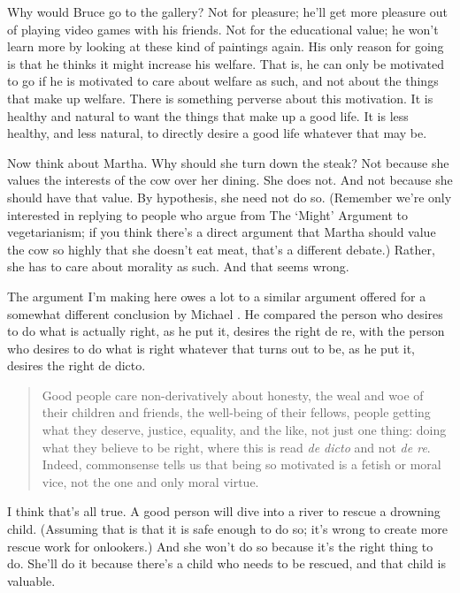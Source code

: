 Why would Bruce go to the gallery? Not for pleasure; he'll get more pleasure out of playing video games with his friends. Not for the educational value; he won't learn more by looking at these kind of paintings again. His only reason for going is that he thinks it might increase his welfare. That is, he can only be motivated to go if he is motivated to care about welfare as such, and not about the things that make up welfare. There is something perverse about this motivation. It is healthy and natural to want the things that make up a good life. It is less healthy, and less natural, to directly desire a good life whatever that may be. 

Now think about Martha. Why should she turn down the steak? Not because she values the interests of the cow over her dining. She does not. And not because she should have that value. By hypothesis, she need not do so. (Remember we're only interested in replying to people who argue from The `Might' Argument to vegetarianism; if you think there's a direct argument that Martha should value the cow so highly that she doesn't eat meat, that's a different debate.) Rather, she has to care about morality as such. And that seems wrong.

The argument I'm making here owes a lot to a similar argument offered for a somewhat different conclusion by Michael  \citet{Smith1994}. He compared the person who desires to do what is actually right, as he put it, desires the right de re, with the person who desires to do what is right whatever that turns out to be, as he put it, desires the right de dicto. 

\begin{quote}

Good people care non-derivatively about honesty, the weal and woe of their children and friends, the well-being of their fellows, people getting what they deserve, justice, equality, and the like, not just one thing: doing what they believe to be right, where this is read \emph{de dicto} and not \emph{de re}. Indeed, commonsense tells us that being so motivated is a fetish or moral vice, not the one and only moral virtue. ~\citep[75]{Smith1994}
\end{quote}
I think that's all true. A good person will dive into a river to rescue a drowning child. (Assuming that is that it is safe enough to do so; it's wrong to create more rescue work for onlookers.) And she won't do so because it's the right thing to do. She'll do it because there's a child who needs to be rescued, and that child is valuable.

